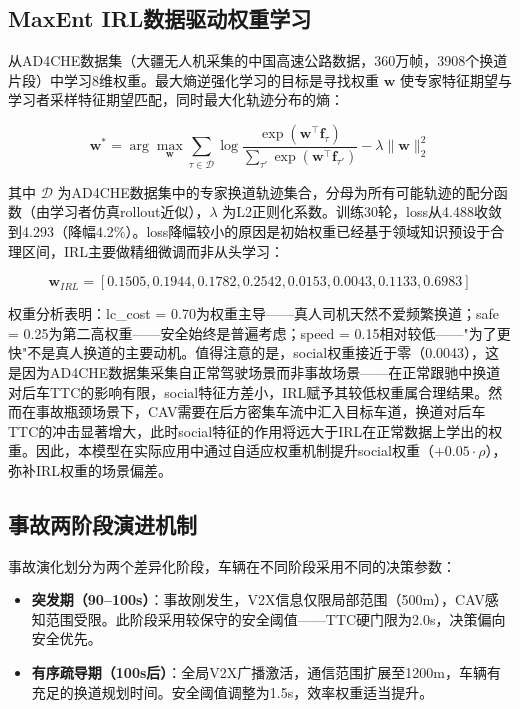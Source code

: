 \subsection{MaxEnt IRL数据驱动权重学习}
从AD4CHE数据集（大疆无人机采集的中国高速公路数据，360万帧，3908个换道片段）中学习8维权重。最大熵逆强化学习的目标是寻找权重 $\mathbf{w}$ 使专家特征期望与学习者采样特征期望匹配，同时最大化轨迹分布的熵：

\begin{equation}
\mathbf{w}^* = \arg\max_{\mathbf{w}} \sum_{\tau \in \mathcal{D}} \log \frac{\exp(\mathbf{w}^\top \mathbf{f}_\tau)}{\sum_{\tau'} \exp(\mathbf{w}^\top \mathbf{f}_{\tau'})} - \lambda \|\mathbf{w}\|_2^2
\end{equation}

其中 $\mathcal{D}$ 为AD4CHE数据集中的专家换道轨迹集合，分母为所有可能轨迹的配分函数（由学习者仿真rollout近似），$\lambda$ 为L2正则化系数。训练30轮，loss从4.488收敛到4.293（降幅4.2\%）。loss降幅较小的原因是初始权重已经基于领域知识预设于合理区间，IRL主要做精细微调而非从头学习：

\begin{equation}
\mathbf{w}_{IRL} = [0.1505, 0.1944, 0.1782, 0.2542, 0.0153, 0.0043, 0.1133, 0.6983]
\end{equation}

权重分析表明：lc\_cost = 0.70为权重主导——真人司机天然不爱频繁换道；safe = 0.25为第二高权重——安全始终是普遍考虑；speed = 0.15相对较低——"为了更快"不是真人换道的主要动机。值得注意的是，social权重接近于零（0.0043），这是因为AD4CHE数据集采集自正常驾驶场景而非事故场景——在正常跟驰中换道对后车TTC的影响有限，social特征方差小，IRL赋予其较低权重属合理结果。然而在事故瓶颈场景下，CAV需要在后方密集车流中汇入目标车道，换道对后车TTC的冲击显著增大，此时social特征的作用将远大于IRL在正常数据上学出的权重。因此，本模型在实际应用中通过自适应权重机制提升social权重（$+0.05 \cdot \rho$），弥补IRL权重的场景偏差。

\subsection{事故两阶段演进机制}
事故演化划分为两个差异化阶段，车辆在不同阶段采用不同的决策参数：

\begin{itemize}
    \item \textbf{突发期（90--100s）}：事故刚发生，V2X信息仅限局部范围（500m），CAV感知范围受限。此阶段采用较保守的安全阈值——TTC硬门限为2.0s，决策偏向安全优先。
    \item \textbf{有序疏导期（100s后）}：全局V2X广播激活，通信范围扩展至1200m，车辆有充足的换道规划时间。安全阈值调整为1.5s，效率权重适当提升。
\end{itemize}

